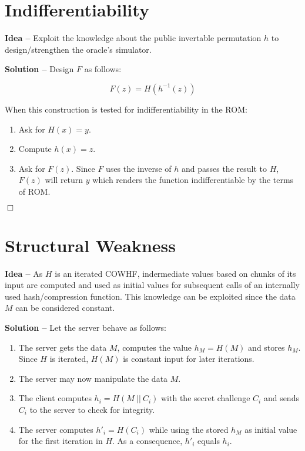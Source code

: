 





\section{Indifferentiability}

\textbf{Idea --} Exploit the knowledge about the public invertable permutation $ h $ to design/strengthen the oracle's simulator.

\textbf{Solution --} Design $ F $ as follows:

$$
F(z) = H(h^{-1}(z))
$$

When this construction is tested for indifferentiability in the ROM:

\begin{enumerate}
\item Ask for $ H(x) = y $.
\item Compute $ h(x) = z $.
\item Ask for $ F(z) $. Since $ F $ uses the inverse of $ h $ and passes the result to $ H $, $ F(z) $ will return $ y $ which renders the function indifferentiable by the terms of ROM.
\end{enumerate}

\hfill$\Box$

\section{Structural Weakness}

\textbf{Idea --} As $ H $ is an iterated COWHF, indermediate values based on chunks of its input are computed and used as initial values for subsequent calls of an internally used hash/compression function. This knowledge can be exploited since the data $ M $ can be considered constant.

\textbf{Solution --} Let the server behave as follows:

\begin{enumerate}
\item The server gets the data $ M $, computes the value $ h_{M} = H(M) $ and stores $ h_{M} $. Since $ H $ is iterated, $ H(M) $ is constant input for later iterations.
\item The server may now manipulate the data $ M $.
\item The client computes $ h_{i} = H(M\ ||\ C_{i}) $ with the secret challenge $ C_{i} $ and sends $ C_{i} $ to the server to check for integrity.
\item The server computes $ h'_{i} = H(C_{i}) $ while using the stored $ h_{M} $ as initial value for the first iteration in $ H $. As a consequence, $ h'_{i} $ equals $ h_{i} $.
\end{enumerate}

